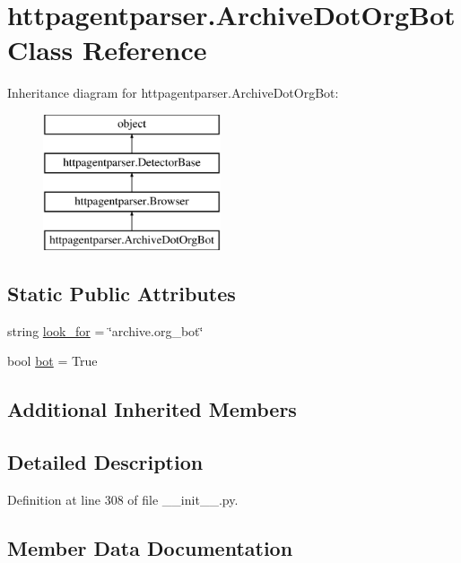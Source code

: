 \hypertarget{classhttpagentparser_1_1_archive_dot_org_bot}{}\section{httpagentparser.\+Archive\+Dot\+Org\+Bot Class Reference}
\label{classhttpagentparser_1_1_archive_dot_org_bot}
Inheritance diagram for httpagentparser.\+Archive\+Dot\+Org\+Bot\+:\begin{figure}[H]
\begin{center}
\leavevmode
\includegraphics[height=4.000000cm]{classhttpagentparser_1_1_archive_dot_org_bot}
\end{center}
\end{figure}
\subsection*{Static Public Attributes}
\begin{DoxyCompactItemize}
\item 
string \hyperlink{classhttpagentparser_1_1_archive_dot_org_bot_a1f2d7847faa0323513c3fe36f5811a59}{look\+\_\+for} = \char`\"{}archive.\+org\+\_\+bot\char`\"{}
\item 
bool \hyperlink{classhttpagentparser_1_1_archive_dot_org_bot_a02ce8ac022e93d41588235605dc6d825}{bot} = True
\end{DoxyCompactItemize}
\subsection*{Additional Inherited Members}


\subsection{Detailed Description}


Definition at line 308 of file \+\_\+\+\_\+init\+\_\+\+\_\+.\+py.



\subsection{Member Data Documentation}
\hypertarget{classhttpagentparser_1_1_archive_dot_org_bot_a02ce8ac022e93d41588235605dc6d825}{}\label{classhttpagentparser_1_1_archive_dot_org_bot_a02ce8ac022e93d41588235605dc6d825} 
